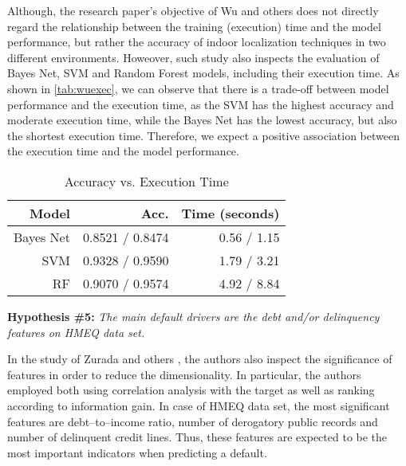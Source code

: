 Although, the research paper's objective of Wu and others \citep{wu2018accurate} does not directly regard the relationship between the training (execution) time and the model performance, but rather the accuracy of indoor localization techniques in two different environments.
Howeover, such study also inspects the evaluation of Bayes Net, SVM and Random Forest models, including their execution time. As shown in \autoref{tab:wuexec}, we can observe that there is a trade-off between model performance and the execution time, as the SVM has the highest accuracy and moderate execution time, while the Bayes Net has the lowest accuracy, but also the shortest execution time.
Therefore, we expect a positive association between the execution time and the model performance.

\begin{table}[H]
    \small
    \setlength{\tabcolsep}{8pt}
    \renewcommand{\arraystretch}{1.3}
    \centering
    \caption[Accuracy vs. Execution Time \citep{wu2018accurate}]{Accuracy vs. Execution Time \citep{wu2018accurate}}\label{tab:wuexec}
    \begin{tabular}{r r r}
    \toprule
    Model & Acc. & Time (seconds) \\
    \midrule
    \hline
    Bayes Net & 0.8521 / 0.8474 & 0.56 / 1.15 \\
    SVM & 0.9328 / 0.9590 & 1.79 / 3.21 \\
    RF & 0.9070 / 0.9574 & 4.92 / 8.84 \\

    \hline
    \bottomrule
    \end{tabular}
    \vspace{0.35em}
    
    \vspace{-1em}
\end{table}

\vspace{0.3cm}

\noindent \textbf{Hypothesis \#5:} \textit{The main default drivers are the debt and/or delinquency features on HMEQ data set.}

In the study of Zurada and others \citep{zurada2014classification}, the authors also inspect the significance of features in order to reduce the dimensionality. In particular, the authors employed both using correlation analysis with the target as well as ranking according to information gain.
In case of HMEQ data set, the most significant features are debt--to--income ratio, number of derogatory public records and number of delinquent credit lines.
Thus, these features are expected to be the most important indicators when predicting a default.
